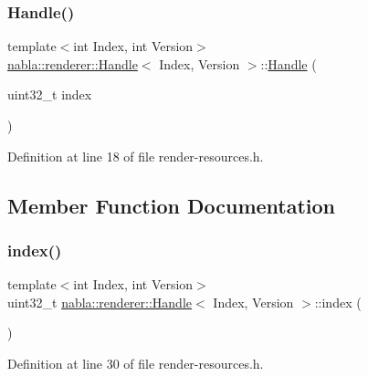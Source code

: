 \subsubsection{\texorpdfstring{Handle()}{Handle()}}
{\footnotesize\ttfamily template$<$int Index, int Version$>$ \\
\mbox{\hyperlink{classnabla_1_1renderer_1_1_handle}{nabla\+::renderer\+::\+Handle}}$<$ Index, Version $>$\+::\mbox{\hyperlink{classnabla_1_1renderer_1_1_handle}{Handle}} (\begin{DoxyParamCaption}\item[{uint32\+\_\+t}]{index }\end{DoxyParamCaption})\hspace{0.3cm}{\ttfamily [inline]}}



Definition at line 18 of file render-\/resources.\+h.



\subsection{Member Function Documentation}
\mbox{\label{classnabla_1_1renderer_1_1_handle_a6a7cfb244abcfbcead2e3d4d47f52167}} 
\subsubsection{\texorpdfstring{index()}{index()}}
{\footnotesize\ttfamily template$<$int Index, int Version$>$ \\
uint32\+\_\+t \mbox{\hyperlink{classnabla_1_1renderer_1_1_handle}{nabla\+::renderer\+::\+Handle}}$<$ Index, Version $>$\+::index (\begin{DoxyParamCaption}{ }\end{DoxyParamCaption})\hspace{0.3cm}{\ttfamily [inline]}}



Definition at line 30 of file render-\/resources.\+h.

\mbox{\label{classnabla_1_1renderer_1_1_handle_a5b9546ca538d96a0e1172fbe1c965793}} 
